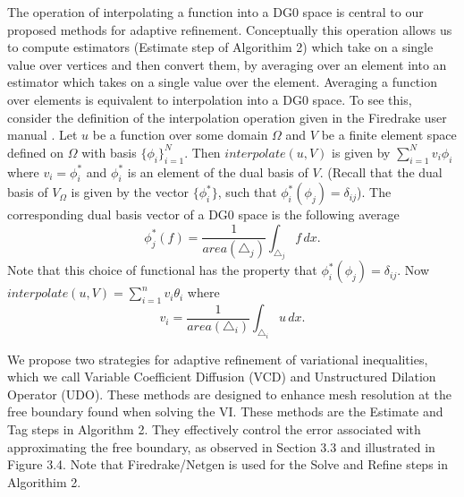 \documentclass[]{interact}
\theoremstyle{plain}%
\theoremstyle{definition}
\theoremstyle{remark}
\begin{document}
The operation of interpolating a function into a DG0 space is central to our proposed methods for adaptive refinement. Conceptually this operation allows us to compute estimators (Estimate step of Algorithim 2) which take on a single value over vertices and then convert them, by averaging over an element into an estimator which takes on a single value over the element. Averaging a function over elements is equivalent to interpolation into a DG0 space. To see this, consider the definition of the interpolation operation given in the Firedrake user manual \cite{FiredrakeUserManual}. 
Let $u$ be a function over some domain $\Omega$ and $V$ be a finite element space defined on $\Omega$ with basis $\{\phi_i\}_{i = 1}^N$. Then $interpolate(u, V)$ is given by $\sum_{i = 1}^N v_i \phi_i$ where $v_i = \phi^*_i$ and $\phi^*_i$ is an element of the dual basis of $V$. (Recall that the dual basis of $V_\Omega$ is given by the vector $\{\phi^*_i\}$, such that $\phi^*_i(\phi_j) = \delta_{ij}$). The corresponding dual basis vector of a DG0 space is the following average
\begin{equation}
  \phi_j^*(f) = \frac{1}{area(\triangle_j)}\int_{\triangle_j} f\, dx.
\end{equation}
Note that this choice of functional has the property that $\phi^*_i(\phi_j) = \delta_{ij}$. Now $interpolate(u, V) = \sum_{i = 1}^n v_i\theta_i$ where
\begin{equation}
  v_i = \frac{1}{area(\triangle_i)}\int_{\triangle_i} u \, dx.
\end{equation}

We propose two strategies for adaptive refinement of variational inequalities, which we call Variable Coefficient Diffusion (VCD) and Unstructured Dilation Operator (UDO). These methods are designed to enhance mesh resolution at the free boundary found when solving the VI. These methods are the Estimate and Tag steps in Algorithm 2. They effectively control the error associated with approximating the free boundary, as observed in Section 3.3 and illustrated in Figure 3.4. Note that Firedrake/Netgen is used for the Solve and Refine steps in Algorithim 2.
\end{document}
